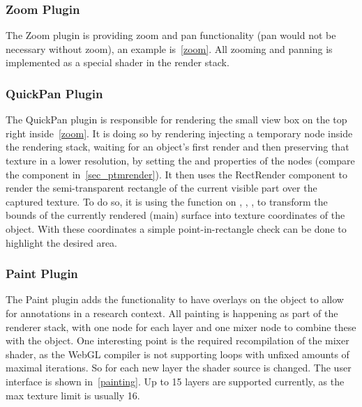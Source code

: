 \subsubsection{Zoom Plugin}
The Zoom plugin is providing zoom and pan functionality (pan would not be
necessary without zoom), an example is~\autoref{zoom}. All zooming and panning
is implemented as a special shader in the render stack.

\subsubsection{QuickPan Plugin}
The QuickPan plugin is responsible for rendering the small view box on the top
right inside~\autoref{zoom}. It is doing so by
rendering injecting a temporary node inside the rendering stack, waiting for an
object's first render and then preserving that texture in a lower resolution, by setting the  and  properties of
the nodes (compare the component in~\autoref{sec_ptmrender}). It then uses the
RectRender component to render the semi-transparent rectangle of the current
visible part over the captured texture. To do so, it is using the  function on \code{[0, 0]},
\code{[0,1]}, \code{[1,1]}, \code{[0,1]} to transform the bounds of the
currently rendered (main) surface into texture coordinates of the object. With
these coordinates a simple point-in-rectangle check can be done to highlight the
desired area.

\subsubsection{Paint Plugin}
The Paint plugin adds the functionality to have overlays on the object to allow
for annotations in a research context. All painting is happening as part of the
renderer stack, with one node for each layer and one mixer node to combine these
with the object. One interesting point is the required recompilation of the
mixer shader,  as the WebGL compiler is not supporting loops with unfixed
amounts of maximal iterations. So for each new layer the shader source is changed.
The user interface is shown in~\autoref{painting}. Up to 15 layers are supported
currently, as the max texture limit is usually 16.

